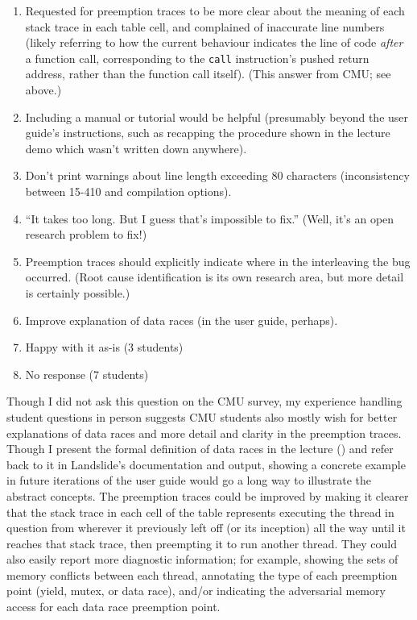\begin{enumerate}
	\item Requested for preemption traces to be more clear about the meaning of each stack trace in each table cell,
		and complained of inaccurate line numbers
		(likely referring to how the current behaviour indicates the line of code {\em after} a function call,
		corresponding to the {\tt call} instruction's pushed return address,
		rather than the function call itself). (This answer from CMU; see above.)
	\item Including a manual or tutorial would be helpful (presumably beyond the user guide's instructions, such as recapping the procedure shown in the lecture demo which wasn't written down anywhere).
	\item Don't print warnings about line length exceeding 80 characters (inconsistency between 15-410 and \psuos compilation options).
	\item ``It takes too long. But I guess that's impossible to fix.'' (Well, it's an open research problem to fix!)
	\item Preemption traces should explicitly indicate where in the interleaving the bug occurred.
		(Root cause identification is its own research area, but more detail is certainly possible.)
	\item Improve explanation of data races (in the user guide, perhaps).
	\item Happy with it as-is (3 students)
	\item No response (7 students)
\end{enumerate}

Though I did not ask this question on the CMU survey,
my experience handling student questions in person
suggests CMU students
also mostly wish for
better explanations of data races and
more detail and clarity in the preemption traces.
Though I present the formal definition of data races in the lecture
(\sect{\ref{sec:education-pebbles-recruiting}})
and refer back to it in Landslide's documentation and output,
showing a concrete example
in future iterations of the user guide
would go a long way to illustrate the abstract concepts.
The preemption traces could be improved by making it clearer that the stack trace in each cell of the table
represents executing the thread in question from wherever it previously left off (or its inception)
all the way until it reaches that stack trace, then preempting it to run another thread.
They could also easily report more diagnostic information;
for example, showing the sets of memory conflicts between each thread,
annotating the type of each preemption point (yield, mutex, or data race),
and/or indicating the adversarial memory access for each data race preemption point.

